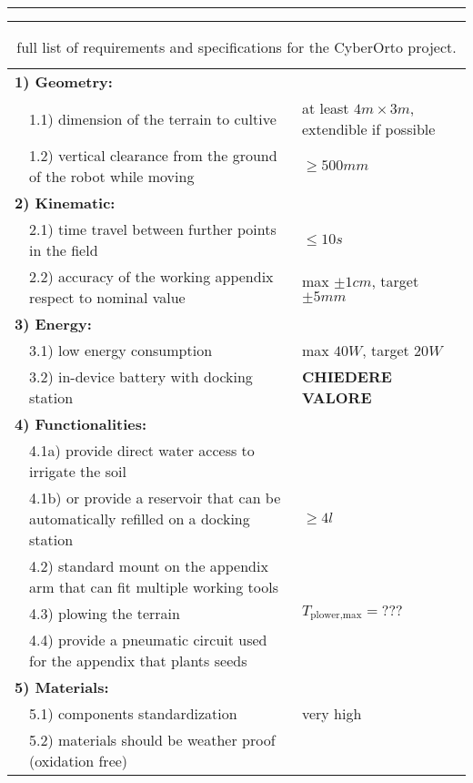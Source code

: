 \begin{table}[pbt]
	\rule{\linewidth}{2pt}
	\caption{full list of requirements and specifications for the CyberOrto project.}
	\label{tab:requirementsspecifications}
	\rule{\linewidth}{1pt} \vspace{0mm}	
	
	\centering
	\begin{tabular}{p{0.2cm} p{8cm} p{5cm} }
		\multicolumn{2}{l}{ \textbf{1) Geometry:} } \\
		& 1.1) dimension of the terrain to cultive & at least $4m\times 3m$, extendible if possible \\
		& 1.2) vertical clearance from the ground of the robot while moving & $\geq 500mm$ \\
		
		\multicolumn{2}{l}{ \textbf{2) Kinematic:} } \\
		& 2.1) time travel between further points in the field & $ \leq 10s$ \\	
		& 2.2) accuracy of the working appendix respect to nominal value & max $\pm 1cm$, target $\pm 5mm$ \\		
		
		\multicolumn{2}{l}{ \textbf{3) Energy:} } \\
		& 3.1) low energy consumption & max $40W$, target $20W$ \\
		& 3.2) in-device battery with docking station & \textbf{CHIEDERE VALORE}\\
				
		\multicolumn{2}{l}{ \textbf{4) Functionalities:} } \\
		& 4.1a) provide direct water access to irrigate the soil \\
		& 4.1b) or provide a reservoir that can be automatically refilled on a docking station & $\geq 4l$ \\
		& 4.2) standard mount on the appendix arm that can fit multiple working tools \\
		& 4.3) plowing the terrain & $T_\textrm{plower,max} = ??? $\\
		& 4.4) provide a pneumatic circuit used for the appendix that plants seeds \\
		
		\multicolumn{2}{l}{ \textbf{5) Materials:} } \\
		& 5.1) components standardization & very high \\
		& 5.2) materials should be weather proof (oxidation free) \\
		

\end{tabular}
\end{table}
